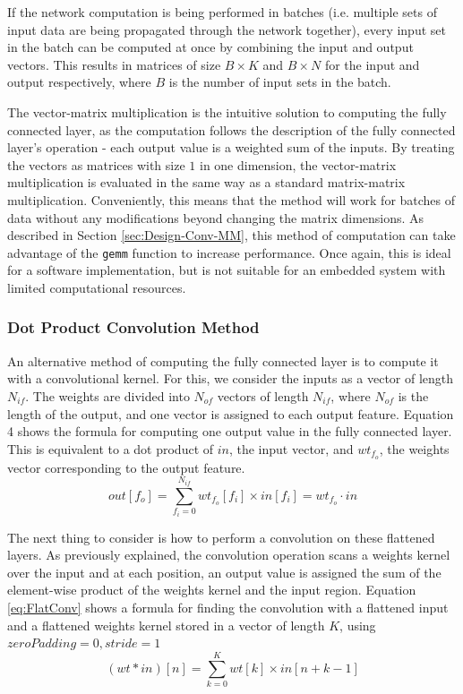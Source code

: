 \documentclass[12pt]{article}
\begin{document}
If the network computation is being performed in batches (i.e. multiple sets of input data are being propagated through the network together), every input set in the batch can be computed at once by combining the input and output vectors. This results in matrices of size $B \times K$ and $B \times N$ for the input and output respectively, where $B$ is the number of input sets in the batch.

The vector-matrix multiplication is the intuitive solution to computing the fully connected layer, as the computation follows the description of the fully connected layer's operation - each output value is a weighted sum of the inputs. By treating the vectors as matrices with size $1$ in one dimension, the vector-matrix multiplication is evaluated in the same way as a standard matrix-matrix multiplication. Conveniently, this means that the method will work for batches of data without any modifications beyond changing the matrix dimensions. As described in Section \ref{sec:Design-Conv-MM}, this method of computation can take advantage of the \lstinline|gemm| function to increase performance. Once again, this is ideal for a software implementation, but is not suitable for an embedded system with limited computational resources.

\subsubsection{Dot Product Convolution Method}
\label{sec:Design-FC-Conv}

An alternative method of computing the fully connected layer is to compute it with a convolutional kernel. For this, we consider the inputs as a vector of length $N_{if}$. The weights are divided into $N_{of}$ vectors of length $N_{if}$, where $N_{of}$ is the length of the output, and one vector is assigned to each output feature. Equation 4 shows the formula for computing one output value in the fully connected layer. This is equivalent to a dot product of $in$, the input vector, and $wt_{f_o}$, the weights vector corresponding to the output feature. 
\begin{equation}
out[f_o] = \sum^{N_{if}}_{f_i=0} wt_{f_o}[f_i]\times in[f_i] = wt_{f_o} \cdot in
\label{eq:DotProd}
\end{equation}

The next thing to consider is how to perform a convolution on these flattened layers. As previously explained, the convolution operation scans a weights kernel over the input and at each position, an output value is assigned the sum of the element-wise product of the weights kernel and the input region. Equation \ref{eq:FlatConv} shows a formula for finding the convolution with a flattened input and a flattened weights kernel stored in a vector of length $K$, using $zeroPadding = 0, stride =1$
\begin{equation}
(wt*in)[n] = \sum^{K}_{k=0} wt[k]\times in[n + k - 1]
\label{eq:FlatConv}
\end{equation}
\end{document}
